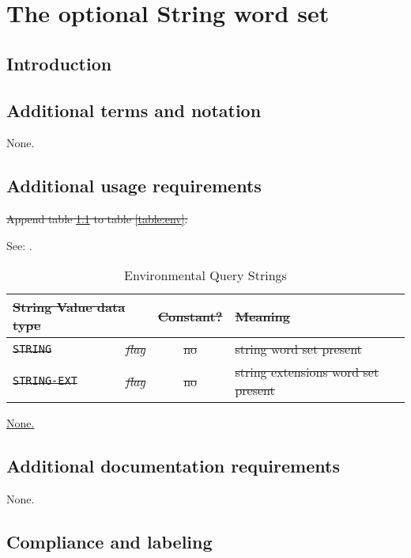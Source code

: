 \chapter{The optional String word set} %

\section{Introduction} %

\section{Additional terms and notation} %

None.

\section{Additional usage requirements} %

\cbstart{}%
\sout{Append table \ref{string:env} to table \ref{table:env}.}

See: .

\begin{table}[ht]
  \begin{center}
	\caption{Environmental Query Strings}
	\label{string:env}
	\begin{tabular}{p{9em}rcp{}}
		\hline\hline
		\multicolumn{2}{l}{\sout{String \hfill Value data type}} & \sout{Constant?} & \sout{Meaning} \\
		\hline
		\sout{\texttt{STRING}}		& \sout{\emph{flag}}	& \sout{no}	&
			\sout{string word set present} \\
		\sout{\texttt{STRING-EXT}}	& \sout{\emph{flag}}	& \sout{no}	&
			\sout{string extensions word set present} \\
		\hline\hline
	\end{tabular}
  \end{center}
\end{table}

\uline{None.}
\cbend

\section{Additional documentation requirements} %

None.

\section{Compliance and labeling} %

